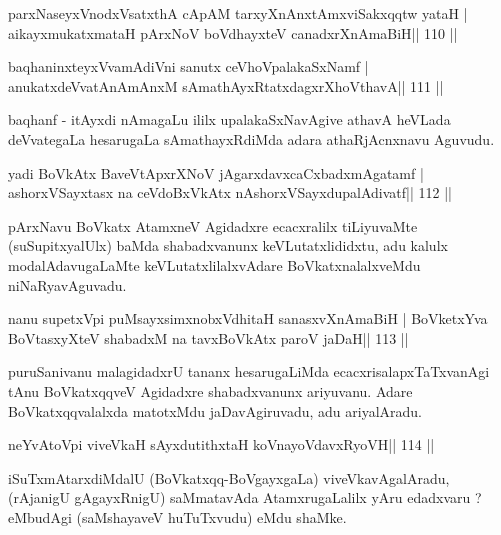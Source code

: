 \begin{shl}
parxNaseyxVnodxVsatxthA cApAM tarxyXnAnxtAmxviSakxqqtw yataH |
aikayxmukatxmataH pArxNoV boVdhayxteV canadxrXnAmaBiH\hfill || 110 ||
\end{shl}

\begin{shl}
baqhaninxteyxVvamAdiVni sanutx ceVhoVpalakaSxNamf |
anukatxdeVvatAnAmAnxM sAmathAyxRtatxdagxrXhoV\s thavA\hfill || 111 ||
\end{shl}

\begin{artha}
baqhanf - itAyxdi nAmagaLu ililx upalakaSxNavAgive athavA heVLada deVvategaLa hesarugaLa sAmathayxRdiMda adara athaRjAcnxnavu Aguvudu.
\end{artha}

\begin{shl}
yadi BoVkAtx BaveVtApxrXNoV jAgarxdavxcaCxbadxmAgatamf |
ashorxVSayxtasx na ceVdoBxVkAtx nAshorxVSayxdupalAdivatf\hfill || 112 ||
\end{shl}

\begin{artha}
pArxNavu BoVkatx AtamxneV Agidadxre ecacxralilx tiLiyuvaMte (suSupitxyalUlx) baMda shabadxvanunx keVLutatxlididxtu, adu kalulx modalAdavugaLaMte keVLutatxlilalxvAdare BoVkatxnalalxveMdu niNaRyavAguvadu.
\end{artha}


\begin{shl}
nanu supetxV\s pi puMsayxsimxnobxVdhitaH sanasxvXnAmaBiH |
BoVketxYva BoVtasxyXteV shabadxM na tavxBoVkAtx paroV jaDaH\hfill || 113 ||
\end{shl}

\begin{artha}
puruSanivanu malagidadxrU tananx hesarugaLiMda ecacxrisalapxTaTxvanAgi tAnu BoVkatxqqveV Agidadxre shabadxvanunx ariyuvanu. Adare BoVkatxqqvalalxda matotxMdu jaDavAgiruvadu, adu ariyalAradu.
\end{artha}

\begin{shl}
neYvAtoV\s pi viveVkaH sAyxdutithxtaH koV\s nayoVdavxRyoVH\hfill || 114 ||
\end{shl}

\begin{artha}
iSuTxmAtarxdiMdalU (BoVkatxqq-BoVgayxgaLa) viveVkavAgalAradu, (rAjanigU 
gAgayxRnigU) saMmatavAda AtamxrugaLalilx yAru edadxvaru ? eMbudAgi (saMshayaveV huTuTxvudu) eMdu shaMke.
\end{artha}


